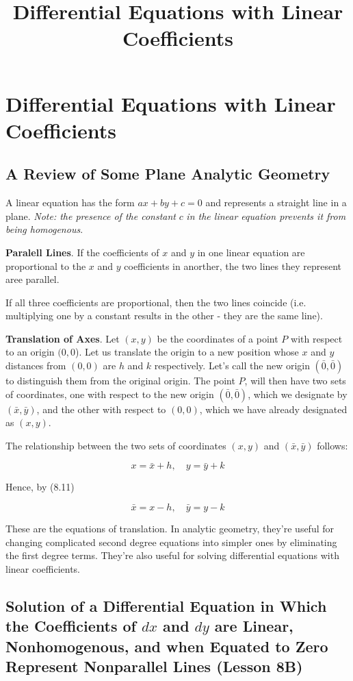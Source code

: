 \documentclass{article}
\title{Differential Equations with Linear Coefficients}
\begin{document}
\section{Differential Equations with Linear Coefficients}

\subsection{A Review of Some Plane Analytic Geometry}

A linear equation has the form $ax + by + c = 0$ and represents a straight line in a plane. \emph{Note: the presence of the constant} $c$ \emph{in the linear equation prevents it from being homogenous}.

\textbf{Paralell Lines}. If the coefficients of $x$ and $y$ in one linear equation are proportional to the $x$ and $y$ coefficients in anorther, the two lines they represent aree parallel.

If all three coefficients are proportional, then the two lines coincide (i.e. multiplying one by a constant results in the other - they are the same line).

\textbf{Translation of Axes}. Let $(x,y)$ be the coordinates of a point $P$ with respect to an origin $(0,0$). Let us translate the origin to a new position whose $x$ and $y$ distances from $(0,0)$ are $h$ and $k$ respectively. Let's call the new origin $(\bar{0},\bar{0})$ to distinguish them from the original origin. The point $P$, will then have two sets of coordinates, one with respect to the new origin $(\bar{0},\bar{0})$, which we designate by $(\bar{x},\bar{y})$, and the other with respect to $(0,0)$, which we have already designated as $(x,y)$.

The relationship between the two sets of coordinates $(x,y)$ and $(\bar{x},\bar{y})$ follows:

\[ x = \bar{x} + h,\quad y=\bar{y} + k \tag{8.11} \]

Hence, by (8.11)

\[ \bar{x} = x - h,\quad \bar{y} = y - k \tag{8.12} \]

These are the equations of translation. In analytic geometry, they're useful for changing complicated second degree equations into simpler ones by eliminating the first degree terms. They're also useful for solving differential equations with linear coefficients.

\subsection{Solution of a Differential Equation in Which the Coefficients of $dx$ and $dy$ are Linear, Nonhomogenous, and when Equated to Zero Represent Nonparallel Lines (Lesson 8B)}
\end{document}
